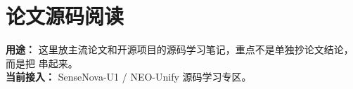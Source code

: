 
\part*{论文源码阅读}
{}

\begin{conceptbox}
\textbf{用途：} 这里放主流论文和开源项目的源码学习笔记，重点不是单独抄论文结论，而是把 串起来。\\
\textbf{当前接入：} SenseNova-U1 / NEO-Unify 源码学习专区。
\end{conceptbox}


